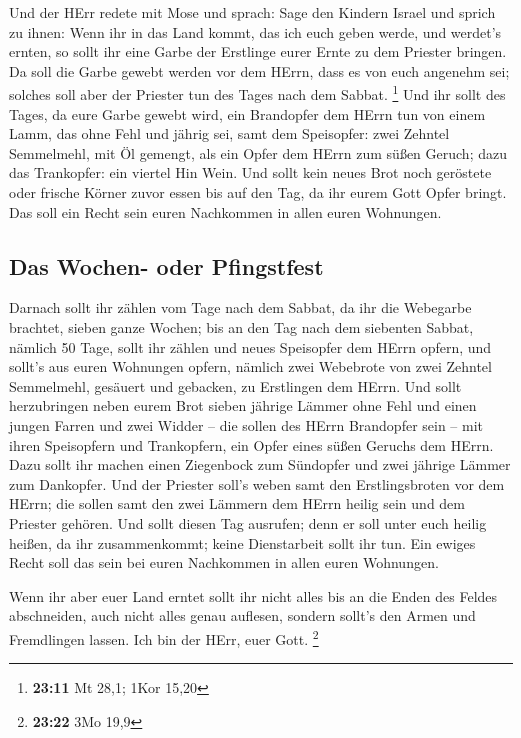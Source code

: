  Und der HErr redete mit Mose und sprach: 
Sage den Kindern Israel und sprich zu ihnen: Wenn ihr in das Land kommt,
das ich euch geben werde, und werdet's ernten, so sollt ihr eine Garbe
der Erstlinge eurer Ernte zu dem Priester bringen.  Da
soll die Garbe gewebt werden vor dem HErrn, dass es von euch angenehm
sei; solches soll aber der Priester tun des Tages nach dem Sabbat.
\footnote{\textbf{23:11} Mt 28,1; 1Kor 15,20}  Und ihr
sollt des Tages, da eure Garbe gewebt wird, ein Brandopfer dem HErrn tun
von einem Lamm, das ohne Fehl und jährig sei,  samt dem
Speisopfer: zwei Zehntel Semmelmehl, mit Öl gemengt, als ein Opfer dem
HErrn zum süßen Geruch; dazu das Trankopfer: ein viertel Hin Wein.
 Und sollt kein neues Brot noch geröstete oder frische
Körner zuvor essen bis auf den Tag, da ihr eurem Gott Opfer bringt. Das
soll ein Recht sein euren Nachkommen in allen euren Wohnungen.

\hypertarget{das-wochen--oder-pfingstfest}{%
\subsection{Das Wochen- oder
Pfingstfest}\label{das-wochen--oder-pfingstfest}}

 Darnach sollt ihr zählen vom Tage nach dem Sabbat, da
ihr die Webegarbe brachtet, sieben ganze Wochen;  bis an
den Tag nach dem siebenten Sabbat, nämlich 50 Tage, sollt ihr zählen und
neues Speisopfer dem HErrn opfern,  und sollt's aus euren
Wohnungen opfern, nämlich zwei Webebrote von zwei Zehntel Semmelmehl,
gesäuert und gebacken, zu Erstlingen dem HErrn.  Und
sollt herzubringen neben eurem Brot sieben jährige Lämmer ohne Fehl und
einen jungen Farren und zwei Widder -- die sollen des HErrn Brandopfer
sein -- mit ihren Speisopfern und Trankopfern, ein Opfer eines süßen
Geruchs dem HErrn.  Dazu sollt ihr machen einen
Ziegenbock zum Sündopfer und zwei jährige Lämmer zum Dankopfer.
 Und der Priester soll's weben samt den Erstlingsbroten
vor dem HErrn; die sollen samt den zwei Lämmern dem HErrn heilig sein
und dem Priester gehören.  Und sollt diesen Tag ausrufen;
denn er soll unter euch heilig heißen, da ihr zusammenkommt; keine
Dienstarbeit sollt ihr tun. Ein ewiges Recht soll das sein bei euren
Nachkommen in allen euren Wohnungen.

 Wenn ihr aber euer Land erntet sollt ihr nicht alles bis
an die Enden des Feldes abschneiden, auch nicht alles genau auflesen,
sondern sollt's den Armen und Fremdlingen lassen. Ich bin der HErr, euer
Gott. \footnote{\textbf{23:22} 3Mo 19,9}

